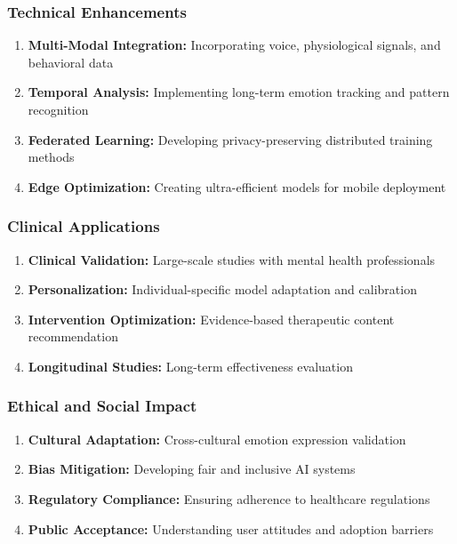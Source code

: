 \documentclass[conference]{IEEEtran}
\begin{document}
\subsubsection{Technical Enhancements}
\begin{enumerate}
    \item \textbf{Multi-Modal Integration:} Incorporating voice, physiological signals, and behavioral data
    \item \textbf{Temporal Analysis:} Implementing long-term emotion tracking and pattern recognition
    \item \textbf{Federated Learning:} Developing privacy-preserving distributed training methods
    \item \textbf{Edge Optimization:} Creating ultra-efficient models for mobile deployment
\end{enumerate}

\subsubsection{Clinical Applications}
\begin{enumerate}
    \item \textbf{Clinical Validation:} Large-scale studies with mental health professionals
    \item \textbf{Personalization:} Individual-specific model adaptation and calibration
    \item \textbf{Intervention Optimization:} Evidence-based therapeutic content recommendation
    \item \textbf{Longitudinal Studies:} Long-term effectiveness evaluation
\end{enumerate}

\subsubsection{Ethical and Social Impact}
\begin{enumerate}
    \item \textbf{Cultural Adaptation:} Cross-cultural emotion expression validation
    \item \textbf{Bias Mitigation:} Developing fair and inclusive AI systems
    \item \textbf{Regulatory Compliance:} Ensuring adherence to healthcare regulations
    \item \textbf{Public Acceptance:} Understanding user attitudes and adoption barriers
\end{enumerate}
\end{document}
